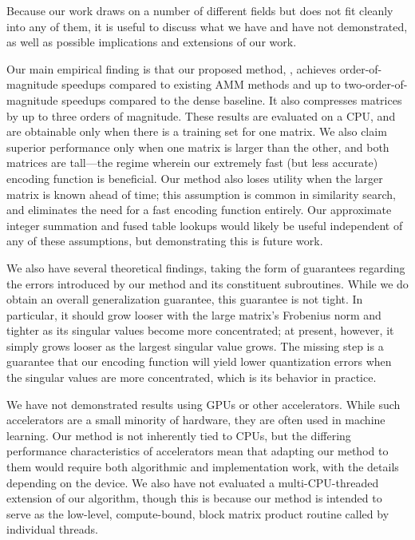 

%


Because our work draws on a number of different fields but does not fit cleanly into any of them, it is useful to discuss what we have and have not demonstrated, as well as possible implications and extensions of our work.


Our main empirical finding is that our proposed method, \ours, achieves order-of-magnitude speedups compared to existing AMM methods and up to two-order-of-magnitude speedups compared to the dense baseline. It also compresses matrices by up to three orders of magnitude. These results are evaluated on a CPU, and are obtainable only when there is a training set for one matrix. We also claim superior performance only when one matrix is larger than the other, and both matrices are tall---the regime wherein our extremely fast (but less accurate) encoding function is beneficial. Our method also loses utility when the larger matrix is known ahead of time; this assumption is common in similarity search, and eliminates the need for a fast encoding function entirely. Our approximate integer summation and fused table lookups would likely be useful independent of any of these assumptions, but demonstrating this is future work.

We also have several theoretical findings, taking the form of guarantees regarding the errors introduced by our method and its constituent subroutines. While we do obtain an overall generalization guarantee, this guarantee is not tight. In particular, it should grow looser with the large matrix's Frobenius norm and tighter as its singular values become more concentrated; at present, however, it simply grows looser as the largest singular value grows. The missing step is a guarantee that our encoding function will yield lower quantization errors when the singular values are more concentrated, which is its behavior in practice.

We have not demonstrated results using GPUs or other accelerators. While such accelerators are a small minority of hardware, they are often used in machine learning. Our method is not inherently tied to CPUs, but the differing performance characteristics of accelerators mean that adapting our method to them would require both algorithmic and implementation work, with the details depending on the device. We also have not evaluated a multi-CPU-threaded extension of our algorithm, though this is because our method is intended to serve as the low-level, compute-bound, block matrix product routine called by individual threads. %

